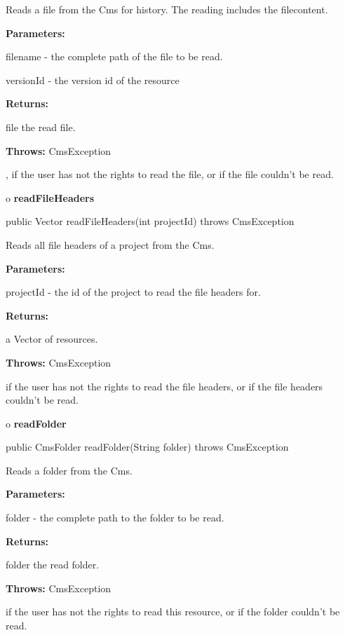 \begin{description}
\htmlDD Reads a file from the Cms for history. \htmlBR
The reading includes the filecontent.

\begin{description}
\item {\bf Parameters:}

filename - the complete path of the file to be read.

versionId - the version id of the resource
\item {\bf Returns:}

file the read file.
\item {\bf Throws:} CmsException

, if the user has not the rights to read the file, or if the file couldn't be
read.
\end{description}

\end{description}

o {\bf readFileHeaders}

\begin{PRE}
 public Vector readFileHeaders(int projectId) throws CmsException
\end{PRE}

\begin{description}
\htmlDD Reads all file headers of a project from the Cms.

\begin{description}
\item {\bf Parameters:}

projectId - the id of the project to read the file headers for.
\item {\bf Returns:}

a Vector of resources.
\item {\bf Throws:} CmsException

if the user has not the rights to read the file headers, or if the file
headers couldn't be read.
\end{description}

\end{description}

o {\bf readFolder}

\begin{PRE}
 public CmsFolder readFolder(String folder) throws CmsException
\end{PRE}

\begin{description}
\htmlDD Reads a folder from the Cms.

\begin{description}
\item {\bf Parameters:}

folder - the complete path to the folder to be read.
\item {\bf Returns:}

folder the read folder.
\item {\bf Throws:} CmsException

if the user has not the rights to read this resource, or if the folder
couldn't be read.
\end{description}

\end{description}


